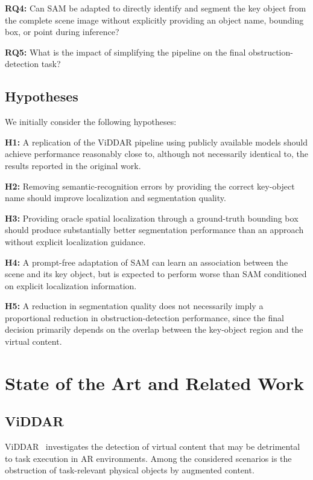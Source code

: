 \documentclass[conference]{IEEEtran}
\begin{document}
\textbf{RQ4:} Can SAM be adapted to directly identify and segment the key object from the complete scene image without explicitly providing an object name, bounding box, or point during inference?

\textbf{RQ5:} What is the impact of simplifying the pipeline on the final obstruction-detection task?

\subsection{Hypotheses}

We initially consider the following hypotheses:

\textbf{H1:} A replication of the ViDDAR pipeline using publicly available models should achieve performance reasonably close to, although not necessarily identical to, the results reported in the original work.

\textbf{H2:} Removing semantic-recognition errors by providing the correct key-object name should improve localization and segmentation quality.

\textbf{H3:} Providing oracle spatial localization through a ground-truth bounding box should produce substantially better segmentation performance than an approach without explicit localization guidance.

\textbf{H4:} A prompt-free adaptation of SAM can learn an association between the scene and its key object, but is expected to perform worse than SAM conditioned on explicit localization information.

\textbf{H5:} A reduction in segmentation quality does not necessarily imply a proportional reduction in obstruction-detection performance, since the final decision primarily depends on the overlap between the key-object region and the virtual content.



\section{State of the Art and Related Work}

\subsection{ViDDAR}

ViDDAR~\cite{viddar} investigates the detection of virtual content that may be detrimental to task execution in AR environments. Among the considered scenarios is the obstruction of task-relevant physical objects by augmented content.
\end{document}
